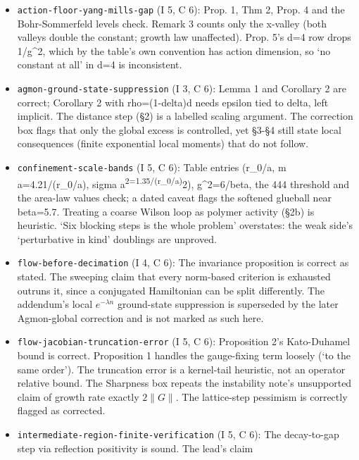 \documentclass[11pt,a4paper]{article}
\begin{document}
\begin{itemize}
  `verbatim' without the threshold computed. `Gapped set is
  (g\_c,infinity)' (intro, §2) overclaims: no monotonicity or single
  transition is proved. `All three isolations are b\_0 statements' (§3)
  is an unlabelled reading.
\item
  \texttt{action-floor-yang-mills-gap} (I 5, C 6): Prop. 1, Thm 2, Prop.
  4 and the Bohr-Sommerfeld levels check. Remark 3 counts only the
  x-valley (both valleys double the constant; growth law unaffected).
  Prop. 5's d=4 row drops 1/g\^{}2, which by the table's own convention
  has action dimension, so `no constant at all' in d=4 is inconsistent.
\item
  \texttt{agmon-ground-state-suppression} (I 3, C 6): Lemma 1 and
  Corollary 2 are correct; Corollary 2 with rho=(1-delta)d needs epsilon
  tied to delta, left implicit. The distance step (§2) is a labelled
  scaling argument. The correction box flags that only the global excess
  is controlled, yet §3-§4 still state local consequences (finite
  exponential local moments) that do not follow.
\item
  \texttt{confinement-scale-bands} (I 5, C 6): Table entries (r\_0/a, m
  a=4.21/(r\_0/a), sigma a\textsuperscript{2=1.35/(r\_0/a)}2),
  g\^{}2=6/beta, the 444 threshold and the area-law values check; a
  dated caveat flags the softened glueball near beta=5.7. Treating a
  coarse Wilson loop as polymer activity (§2b) is heuristic. `Six
  blocking steps is the whole problem' overstates: the weak side's
  `perturbative in kind' doublings are unproved.
\item
  \texttt{flow-before-decimation} (I 4, C 6): The invariance proposition
  is correct as stated. The sweeping claim that every norm-based
  criterion is exhausted outruns it, since a conjugated Hamiltonian can
  be split differently. The addendum's local \(e^{-\lambda n}\)
  ground-state suppression is superseded by the later Agmon-global
  correction and is not marked as such here.
\item
  \texttt{flow-jacobian-truncation-error} (I 5, C 6): Proposition 2's
  Kato-Duhamel bound is correct. Proposition 1 handles the gauge-fixing
  term loosely (`to the same order'). The truncation error is a
  kernel-tail heuristic, not an operator relative bound. The Sharpness
  box repeats the instability note's unsupported claim of growth rate
  exactly \(2\|G\|\). The lattice-step pessimism is correctly flagged as
  corrected.
\item
  \texttt{intermediate-region-finite-verification} (I 5, C 6): The
  decay-to-gap step via reflection positivity is sound. The lead's claim

\end{itemize}
\end{document}
